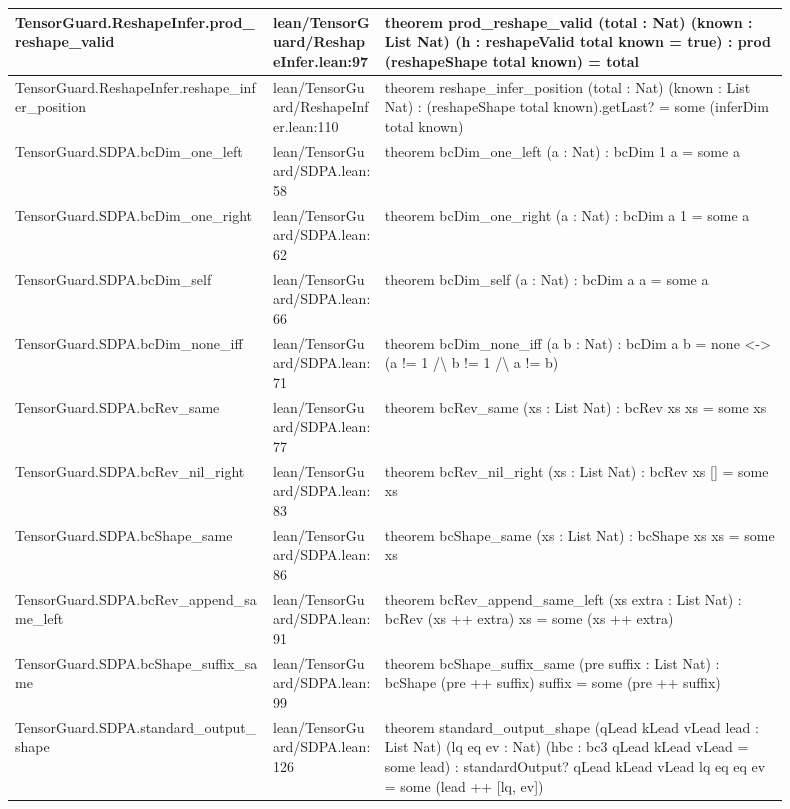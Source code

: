 \documentclass[10pt]{article}
\begin{document}
\begin{longtable}{|p{0.30\linewidth}|p{0.13\linewidth}|p{0.47\linewidth}|}
\hline
TensorGuard.ReshapeInfer.prod\_reshape\_valid & lean/TensorGuard/ReshapeInfer.lean:97 & theorem prod\_reshape\_valid (total : Nat) (known : List Nat) (h : reshapeValid total known = true) : prod (reshapeShape total known) = total \\
\hline
TensorGuard.ReshapeInfer.reshape\_infer\_position & lean/TensorGuard/ReshapeInfer.lean:110 & theorem reshape\_infer\_position (total : Nat) (known : List Nat) : (reshapeShape total known).getLast? = some (inferDim total known) \\
\hline
TensorGuard.SDPA.bcDim\_one\_left & lean/TensorGuard/SDPA.lean:58 & theorem bcDim\_one\_left (a : Nat) : bcDim 1 a = some a \\
\hline
TensorGuard.SDPA.bcDim\_one\_right & lean/TensorGuard/SDPA.lean:62 & theorem bcDim\_one\_right (a : Nat) : bcDim a 1 = some a \\
\hline
TensorGuard.SDPA.bcDim\_self & lean/TensorGuard/SDPA.lean:66 & theorem bcDim\_self (a : Nat) : bcDim a a = some a \\
\hline
TensorGuard.SDPA.bcDim\_none\_iff & lean/TensorGuard/SDPA.lean:71 & theorem bcDim\_none\_iff (a b : Nat) : bcDim a b = none <-> (a != 1 /\textbackslash{} b != 1 /\textbackslash{} a != b) \\
\hline
TensorGuard.SDPA.bcRev\_same & lean/TensorGuard/SDPA.lean:77 & theorem bcRev\_same (xs : List Nat) : bcRev xs xs = some xs \\
\hline
TensorGuard.SDPA.bcRev\_nil\_right & lean/TensorGuard/SDPA.lean:83 & theorem bcRev\_nil\_right (xs : List Nat) : bcRev xs [] = some xs \\
\hline
TensorGuard.SDPA.bcShape\_same & lean/TensorGuard/SDPA.lean:86 & theorem bcShape\_same (xs : List Nat) : bcShape xs xs = some xs \\
\hline
TensorGuard.SDPA.bcRev\_append\_same\_left & lean/TensorGuard/SDPA.lean:91 & theorem bcRev\_append\_same\_left (xs extra : List Nat) : bcRev (xs ++ extra) xs = some (xs ++ extra) \\
\hline
TensorGuard.SDPA.bcShape\_suffix\_same & lean/TensorGuard/SDPA.lean:99 & theorem bcShape\_suffix\_same (pre suffix : List Nat) : bcShape (pre ++ suffix) suffix = some (pre ++ suffix) \\
\hline
TensorGuard.SDPA.standard\_output\_shape & lean/TensorGuard/SDPA.lean:126 & theorem standard\_output\_shape (qLead kLead vLead lead : List Nat) (lq eq ev : Nat) (hbc : bc3 qLead kLead vLead = some lead) : standardOutput? qLead kLead vLead lq eq eq ev = some (lead ++ [lq, ev]) \\

\end{longtable}
\end{document}
